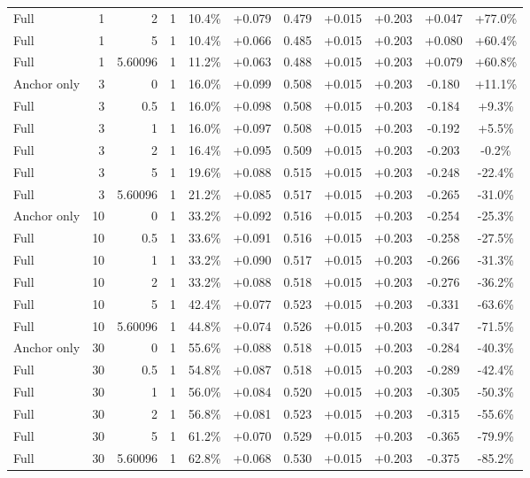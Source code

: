 \begin{table}[htbp]
\begin{tabular}{lrrrccccccc}
Full & 1 & 2 & 1 & 10.4\% & +0.079 & 0.479 & +0.015 & +0.203 & +0.047 & +77.0\% \\
Full & 1 & 5 & 1 & 10.4\% & +0.066 & 0.485 & +0.015 & +0.203 & +0.080 & +60.4\% \\
Full & 1 & 5.60096 & 1 & 11.2\% & +0.063 & 0.488 & +0.015 & +0.203 & +0.079 & +60.8\% \\
Anchor only & 3 & 0 & 1 & 16.0\% & +0.099 & 0.508 & +0.015 & +0.203 & -0.180 & +11.1\% \\
Full & 3 & 0.5 & 1 & 16.0\% & +0.098 & 0.508 & +0.015 & +0.203 & -0.184 & +9.3\% \\
Full & 3 & 1 & 1 & 16.0\% & +0.097 & 0.508 & +0.015 & +0.203 & -0.192 & +5.5\% \\
Full & 3 & 2 & 1 & 16.4\% & +0.095 & 0.509 & +0.015 & +0.203 & -0.203 & -0.2\% \\
Full & 3 & 5 & 1 & 19.6\% & +0.088 & 0.515 & +0.015 & +0.203 & -0.248 & -22.4\% \\
Full & 3 & 5.60096 & 1 & 21.2\% & +0.085 & 0.517 & +0.015 & +0.203 & -0.265 & -31.0\% \\
Anchor only & 10 & 0 & 1 & 33.2\% & +0.092 & 0.516 & +0.015 & +0.203 & -0.254 & -25.3\% \\
Full & 10 & 0.5 & 1 & 33.6\% & +0.091 & 0.516 & +0.015 & +0.203 & -0.258 & -27.5\% \\
Full & 10 & 1 & 1 & 33.2\% & +0.090 & 0.517 & +0.015 & +0.203 & -0.266 & -31.3\% \\
Full & 10 & 2 & 1 & 33.2\% & +0.088 & 0.518 & +0.015 & +0.203 & -0.276 & -36.2\% \\
Full & 10 & 5 & 1 & 42.4\% & +0.077 & 0.523 & +0.015 & +0.203 & -0.331 & -63.6\% \\
Full & 10 & 5.60096 & 1 & 44.8\% & +0.074 & 0.526 & +0.015 & +0.203 & -0.347 & -71.5\% \\
Anchor only & 30 & 0 & 1 & 55.6\% & +0.088 & 0.518 & +0.015 & +0.203 & -0.284 & -40.3\% \\
Full & 30 & 0.5 & 1 & 54.8\% & +0.087 & 0.518 & +0.015 & +0.203 & -0.289 & -42.4\% \\
Full & 30 & 1 & 1 & 56.0\% & +0.084 & 0.520 & +0.015 & +0.203 & -0.305 & -50.3\% \\
Full & 30 & 2 & 1 & 56.8\% & +0.081 & 0.523 & +0.015 & +0.203 & -0.315 & -55.6\% \\
Full & 30 & 5 & 1 & 61.2\% & +0.070 & 0.529 & +0.015 & +0.203 & -0.365 & -79.9\% \\
Full & 30 & 5.60096 & 1 & 62.8\% & +0.068 & 0.530 & +0.015 & +0.203 & -0.375 & -85.2\% \\

\end{tabular}
\end{table}
